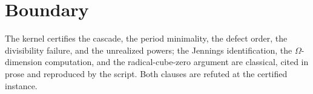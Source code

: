 \documentclass[11pt]{article}
\begin{document}
\section{Boundary}

The kernel certifies the cascade, the period minimality, the defect
order, the divisibility failure, and the unrealized powers; the
Jennings identification, the $\Omega$-dimension computation, and
the radical-cube-zero argument are classical, cited in prose and
reproduced by the script.  Both clauses are refuted at the
certified instance.
\end{document}
